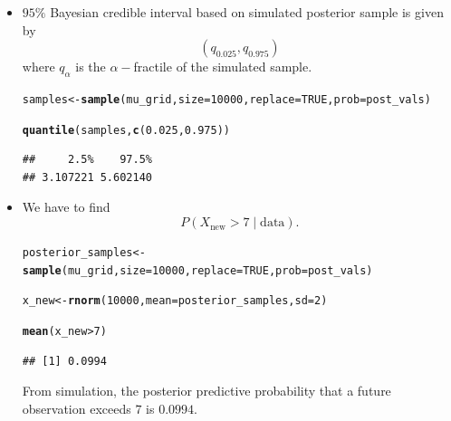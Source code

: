 \documentclass[11pt, a4paper]{article}\usepackage[]{graphicx}\usepackage[]{xcolor}
\makeatletter
\newcommand{\hlnum}[1]{\textcolor[rgb]{0.686,0.059,0.569}{#1}}%
\newcommand{\hlopt}[1]{\textcolor[rgb]{0,0,0}{#1}}%
\newcommand{\hldef}[1]{\textcolor[rgb]{0.345,0.345,0.345}{#1}}%
\newcommand{\hlkwb}[1]{\textcolor[rgb]{0.69,0.353,0.396}{#1}}%
\newcommand{\hlkwc}[1]{\textcolor[rgb]{0.333,0.667,0.333}{#1}}%
\newcommand{\hlkwd}[1]{\textcolor[rgb]{0.737,0.353,0.396}{\textbf{#1}}}%
\newenvironment{kframe}{%
 \def\at@end@of@kframe{}%
 \ifinner\ifhmode%
  \def\at@end@of@kframe{\end{minipage}}%
  \begin{minipage}{\columnwidth}%
 \fi\fi%
 \def\FrameCommand##1{\hskip\@totalleftmargin \hskip-\fboxsep
 \colorbox{shadecolor}{##1}\hskip-\fboxsep
     \hskip-\linewidth \hskip-\@totalleftmargin \hskip\columnwidth}%
 \MakeFramed {\advance\hsize-\width
   \@totalleftmargin\z@ \linewidth\hsize
   \@setminipage}}%
 {\par\unskip\endMakeFramed%
 \at@end@of@kframe}
\newenvironment{knitrout}{}{} %
\makeatother
\begin{document}
\begin{itemize}

\item[\scalebox{2.0}{\twemoji{keycap: 3}}] \hspace{0.3cm} $95\%$ Bayesian credible interval based on simulated posterior sample is given by $$(q_{0.025}, q_{0.975})$$ where $q_{\alpha}$ is the $\alpha-$fractile of the simulated sample.

\begin{knitrout}
\color{fgcolor}\begin{kframe}
\begin{alltt}
\hldef{samples} \hlkwb{<-} \hlkwd{sample}\hldef{(mu_grid,} \hlkwc{size} \hldef{=} \hlnum{10000}\hldef{,} \hlkwc{replace} \hldef{=} \hlnum{TRUE}\hldef{,} \hlkwc{prob} \hldef{= post_vals)}

\hlkwd{quantile}\hldef{(samples,} \hlkwd{c}\hldef{(}\hlnum{0.025}\hldef{,} \hlnum{0.975}\hldef{))}
\end{alltt}
\begin{verbatim}
##     2.5%    97.5% 
## 3.107221 5.602140
\end{verbatim}
\end{kframe}
\end{knitrout}

\end{itemize}

\begin{itemize}
\item[\scalebox{2.0}{\twemoji{keycap: 4}}] \hspace{0.3cm} We have to find $$P(X_{\text{new}} > 7 \mid \text{data}).$$

\begin{knitrout}
\color{fgcolor}\begin{kframe}
\begin{alltt}
\hldef{posterior_samples} \hlkwb{<-} \hlkwd{sample}\hldef{(mu_grid,} \hlkwc{size} \hldef{=} \hlnum{10000}\hldef{,} \hlkwc{replace} \hldef{=} \hlnum{TRUE}\hldef{,} \hlkwc{prob} \hldef{= post_vals)}

\hldef{x_new} \hlkwb{<-} \hlkwd{rnorm}\hldef{(}\hlnum{10000}\hldef{,} \hlkwc{mean} \hldef{= posterior_samples,} \hlkwc{sd} \hldef{=} \hlnum{2}\hldef{)}

\hlkwd{mean}\hldef{(x_new} \hlopt{>} \hlnum{7}\hldef{)}
\end{alltt}
\begin{verbatim}
## [1] 0.0994
\end{verbatim}
\end{kframe}
\end{knitrout}

From simulation, the posterior predictive probability that a future observation exceeds $7$ is $0.0994$.

\end{itemize}
\end{document}
